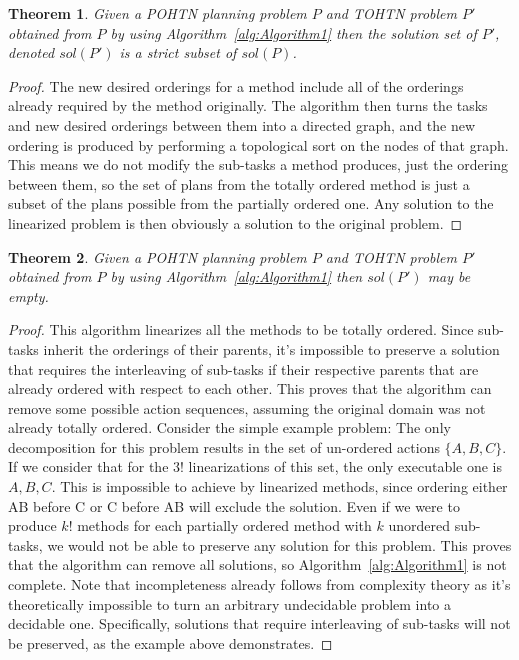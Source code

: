 \documentclass[letterpaper]{article} %
\newtheorem{theorem}{Theorem}
\begin{document}
\begin{theorem}\label{thm:Soundness}
	Given a POHTN planning problem $P$ and TOHTN problem
	$P'$ obtained from $P$ by using Algorithm~\ref{alg:Algorithm1}
	then the solution set of $P'$, denoted $sol(P')$ is a strict subset of $sol(P)$.
\end{theorem}
\begin{proof}
	The new desired orderings for a method include all of the orderings already required by the method originally. The algorithm then turns the tasks and new desired orderings between them into a directed graph, and the new ordering is produced by performing a topological sort on the nodes of that graph. This means we do not modify the sub-tasks a method produces, just the ordering between them, so the set of plans from the totally ordered method is just a subset of the plans possible from the partially ordered one. Any solution to the linearized problem is then obviously a solution to the original problem.
\end{proof}



\begin{theorem}\label{thm:notCompleteness}
	Given a POHTN planning problem $P$ and TOHTN problem
	$P'$ obtained from $P$ by using Algorithm~\ref{alg:Algorithm1}
	then $sol(P')$ may be empty.
\end{theorem}
\begin{proof}
	This algorithm linearizes all the methods to be totally ordered. Since sub-tasks inherit the orderings of their parents, it's impossible to preserve a solution that requires the interleaving of sub-tasks if their respective parents that are already ordered with respect to each other. This proves that the algorithm can remove some possible action sequences, assuming the original domain was not already totally ordered. Consider the simple example problem:
	The only decomposition for this problem results in the set of un-ordered actions $\{A, B, C\}$.
	If we consider that for the $3!$ linearizations of this set, the only executable one is $A, B, C$. This is impossible to achieve by linearized methods, since ordering either AB before C or C before AB will exclude the solution. 
	Even if we were to produce $k!$ methods for each partially ordered method with $k$ unordered sub-tasks, we would not be able to preserve any solution for this problem.
	This proves that the algorithm can remove all solutions, so Algorithm~\ref{alg:Algorithm1} is not complete. Note that incompleteness already follows from complexity theory as it's theoretically impossible to turn an arbitrary undecidable problem into a decidable one.
	Specifically, solutions that require interleaving of sub-tasks will not be preserved, as the example above demonstrates.
\end{proof}
\end{document}
